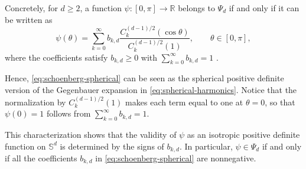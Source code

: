 \documentclass[12pt]{report} %
\newcommand{\Sd}{\mathbb{S}^{d}}
\begin{document}
Concretely, for $d\geq 2$, a function $\psi:[0,\pi]\to\mathbb{R}$ belongs to $\Psi_d$ if and only if it can be written as
\begin{equation}
    \label{eq:schoenberg-spherical}
    \psi(\theta) = \sum_{k=0}^{\infty}
    b_{k,d} \frac{C_k^{(d-1)/2}(\cos\theta)}{C_k^{(d-1)/2}(1)},
    \qquad \theta\in[0,\pi],
\end{equation}
where the coefficients satisfy $b_{k,d}\geq 0$ with $\sum_{k=0}^{\infty} b_{k,d}=1$ \citep{Gneiting2013}. 

Hence, \eqref{eq:schoenberg-spherical} can be seen as the spherical positive definite version of the Gegenbauer expansion in \eqref{eq:spherical-harmonics}. Notice that the normalization by $C_k^{(d-1)/2}(1)$ makes each term equal to one at $\theta=0$, so that $\psi(0)=1$ follows from $\sum_{k=0}^{\infty}b_{k,d}=1$. 

This characterization shows that the validity of $\psi$ as an isotropic
positive definite function on $\Sd$ is determined by the signs of $b_{k,d}$. In particular, $\psi\in\Psi_d$ if and only if all the
coefficients $b_{k,d}$ in \eqref{eq:schoenberg-spherical} are nonnegative.
\end{document}
